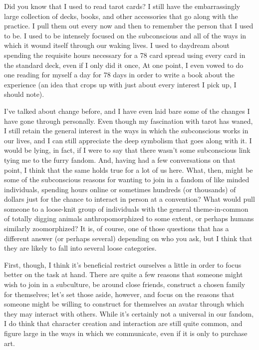 
Did you know that I used to read tarot cards? I still have the embarrassingly large collection of decks, books, and other accessories that go along with the practice. I pull them out every now and then to remember the person that I used to be. I used to be intensely focused on the subconscious and all of the ways in which it wound itself through our waking lives. I used to daydream about spending the requisite hours necessary for a 78 card spread using every card in the standard deck, even if I only did it once, At one point, I even vowed to do one reading for myself a day for 78 days in order to write a book about the experience (an idea that crops up with just about every interest I pick up, I should note).

I've talked about change before, and I have even laid bare some of the changes I have gone through personally. Even though my fascination with tarot has waned, I still retain the general interest in the ways in which the subconscious works in our lives, and I can still appreciate the deep symbolism that goes along with it. I would be lying, in fact, if I were to say that there wasn't some subconscious link tying me to the furry fandom. And, having had a few conversations on that point, I think that the same holds true for a lot of us here. What, then, might be some of the subconscious reasons for wanting to join in a fandom of like minded individuals, spending hours online or sometimes hundreds (or thousands) of dollars just for the chance to interact in person at a convention? What would pull someone to a loose-knit group of individuals with the general theme-in-common of totally digging animals anthropomorphized to some extent, or perhaps humans similarly zoomorphized? It is, of course, one of those questions that has a different answer (or perhaps several) depending on who you ask, but I think that they are likely to fall into several loose categories.

First, though, I think it's beneficial restrict ourselves a little in order to focus better on the task at hand. There are quite a few reasons that someone might wish to join in a subculture, be around close friends, construct a chosen family for themselves; let's set those aside, however, and focus on the reasons that someone might be willing to construct for themselves an avatar through which they may interact with others. While it's certainly not a universal in our fandom, I do think that character creation and interaction are still quite common, and figure large in the ways in which we communicate, even if it is only to purchase art.

